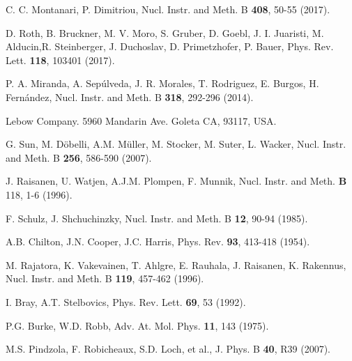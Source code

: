 \begin{thebibliography}{9}
C. C. Montanari, P. Dimitriou, 
Nucl. Instr. and Meth. B \textbf{408},  50-55 (2017).

D. Roth, B. Bruckner, M. V. Moro, S. Gruber, D. Goebl, J. I. Juaristi, 
M. Alducin,R. Steinberger, J. Duchoslav, D. Primetzhofer, P. Bauer, 
Phys. Rev. Lett. \textbf{118}, 103401 (2017).

\begin{comment}
\bibitem{zenodo} 
C.C. Montanari \textit{et al.} DOI: 10.5281/zenodo.3678785 
\end{comment}
P. A. Miranda, A. Sep\'ulveda, J. R. Morales, T. Rodriguez, E. Burgos, 
H. Fern\'andez,
Nucl. Instr. and Meth. B \textbf{318}, 292-296  (2014).

Lebow Company. 5960 Mandarin Ave. Goleta CA, 93117, USA.

G. Sun, M. D\"{o}belli, A.M. M\"{u}ller, M. Stocker, M. Suter, L. Wacker, 
Nucl. Instr. and Meth. B \textbf{256}, 586-590 (2007).

J. Raisanen, U. Watjen, A.J.M. Plompen, F. Munnik, 
Nucl. Instr. and Meth. \textbf{B} 118, 1-6  (1996).

F. Schulz, J. Shchuchinzky, 
Nucl. Instr. and Meth. B \textbf{12},  90-94 (1985).

A.B. Chilton, J.N. Cooper, J.C. Harris, 
Phys. Rev. \textbf{93}, 413-418  (1954).

M. Rajatora, K. Vakevainen, T. Ahlgre, E. Rauhala, J. Raisanen, K. Rakennus, 
Nucl. Instr. and Meth. B \textbf{119}, 457-462 (1996).




I. Bray, A.T. Stelbovics, 
Phys. Rev. Lett. \textbf{69}, 53 (1992).

P.G. Burke, W.D. Robb, 
Adv. At. Mol. Phys. \textbf{11}, 143 (1975).

M.S. Pindzola, F. Robicheaux, S.D. Loch, et al., 
J. Phys. B \textbf{40}, R39 (2007).


\end{thebibliography}
